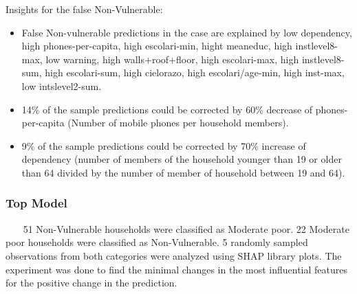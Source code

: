         Insights for the false Non-Vulnerable:
        \begin{itemize}
            \item False Non-vulnerable predictions in the case are explained by low dependency, high phones-per-capita, high escolari-min, hight meaneduc, high instlevel8-max, low warning, high walls+roof+floor, high escolari-max, high instlevel8-sum, high escolari-sum, high cielorazo, high escolari/age-min, high inst-max, low intslevel2-sum.
            \item 14\% of the sample predictions could be corrected by 60\% decrease of phones-per-capita (Number of mobile phones per household members). 
            \item 9\% of the sample predictions could be corrected by 70\% increase of dependency (number of members of the household younger than 19 or older than 64 divided by the number of member of household between 19 and 64). 
        \end{itemize}
        
    \subsubsection{Top Model}~~~
        51 Non-Vulnerable households were classified as Moderate poor. 22 Moderate poor households were classified as Non-Vulnerable. 5 randomly sampled observations from both categories were analyzed using SHAP library plots. The experiment was done to find the minimal changes in the most influential features for the positive change in the prediction.
        
